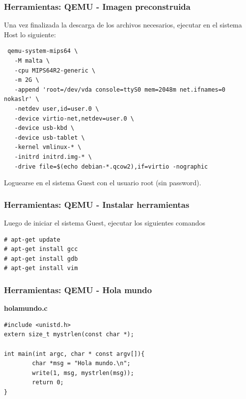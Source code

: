 \documentclass{beamer}
\begin{document}
\begin{frame}[fragile]
 \frametitle{Herramientas: QEMU - Imagen preconstruida}
Una vez finalizada la descarga de los archivos necesarios, ejecutar en el sistema Host lo siguiente:

\begin{lstlisting}
 qemu-system-mips64 \
   -M malta \
   -cpu MIPS64R2-generic \
   -m 2G \
   -append 'root=/dev/vda console=ttyS0 mem=2048m net.ifnames=0 nokaslr' \
   -netdev user,id=user.0 \
   -device virtio-net,netdev=user.0 \
   -device usb-kbd \
   -device usb-tablet \
   -kernel vmlinux-* \
   -initrd initrd.img-* \
   -drive file=$(echo debian-*.qcow2),if=virtio -nographic
\end{lstlisting}

Loguearse en el sistema Guest con el usuario root (sin password).
\end{frame}  


\begin{frame}[fragile]
 \frametitle{Herramientas: QEMU - Instalar herramientas}
Luego de iniciar el sistema Guest, ejecutar los siguientes comandos

 \begin{lstlisting}
# apt-get update
# apt-get install gcc
# apt-get install gdb
# apt-get install vim
 \end{lstlisting}

\end{frame}  



  \begin{frame}[fragile]
 \frametitle{Herramientas: QEMU - Hola mundo} 
\textbf{holamundo.c}
\begin{lstlisting}
#include <unistd.h>
extern size_t mystrlen(const char *);

int main(int argc, char * const argv[]){
        char *msg = "Hola mundo.\n";
        write(1, msg, mystrlen(msg));
        return 0;
}

\end{lstlisting}
\end{frame}
\end{document}
